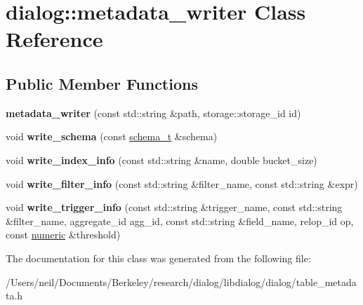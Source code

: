 \hypertarget{classdialog_1_1metadata__writer}{}\section{dialog\+:\+:metadata\+\_\+writer Class Reference}
\label{classdialog_1_1metadata__writer}
\subsection*{Public Member Functions}
\begin{DoxyCompactItemize}
\item 
\mbox{\label{classdialog_1_1metadata__writer_a0d15f0dfbedada257e6cd823f45a5549}} 
{\bfseries metadata\+\_\+writer} (const std\+::string \&path, storage\+::storage\+\_\+id id)
\item 
\mbox{\label{classdialog_1_1metadata__writer_aa2afdab72496ce667cdc152e84bf6d4b}} 
void {\bfseries write\+\_\+schema} (const \hyperlink{classdialog_1_1schema__t}{schema\+\_\+t} \&schema)
\item 
\mbox{\label{classdialog_1_1metadata__writer_a4e637156b29bdfcb043780d2fa305e11}} 
void {\bfseries write\+\_\+index\+\_\+info} (const std\+::string \&name, double bucket\+\_\+size)
\item 
\mbox{\label{classdialog_1_1metadata__writer_ad0e4dada645536bcdb364b32ce515223}} 
void {\bfseries write\+\_\+filter\+\_\+info} (const std\+::string \&filter\+\_\+name, const std\+::string \&expr)
\item 
\mbox{\label{classdialog_1_1metadata__writer_ab7fc38445852d6694a29eb3517c8cc10}} 
void {\bfseries write\+\_\+trigger\+\_\+info} (const std\+::string \&trigger\+\_\+name, const std\+::string \&filter\+\_\+name, aggregate\+\_\+id agg\+\_\+id, const std\+::string \&field\+\_\+name, relop\+\_\+id op, const \hyperlink{classdialog_1_1numeric}{numeric} \&threshold)
\end{DoxyCompactItemize}


The documentation for this class was generated from the following file\+:\begin{DoxyCompactItemize}
\item 
/\+Users/neil/\+Documents/\+Berkeley/research/dialog/libdialog/dialog/table\+\_\+metadata.\+h\end{DoxyCompactItemize}
